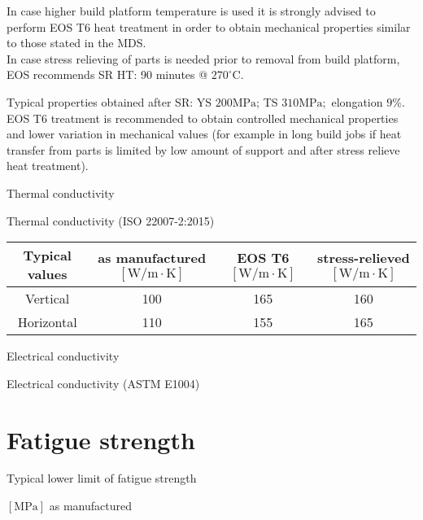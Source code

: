 \documentclass[10pt]{article}
\begin{document}
In case higher build platform temperature is used it is strongly advised to perform EOS T6 heat treatment in order to obtain mechanical properties similar to those stated in the MDS.\\
In case stress relieving of parts is needed prior to removal from build platform, EOS recommends SR HT: 90 minutes @ $270^{\circ} \mathrm{C}$.

Typical properties obtained after SR: YS $200 \mathrm{MPa}$; TS $310 \mathrm{MPa} ;$ elongation $9 \%$.\\
EOS T6 treatment is recommended to obtain controlled mechanical properties and lower variation in mechanical values (for example in long build jobs if heat transfer from parts is limited by low amount of support and after stress relieve heat treatment).

Thermal conductivity

Thermal conductivity (ISO 22007-2:2015)

\begin{center}
\begin{tabular}{|c|c|c|c|}
\hline
Typical values & as manufactured $[\mathrm{W} / \mathrm{m} \cdot \mathrm{K}]$ & EOS T6 $[\mathrm{W} / \mathrm{m} \cdot \mathrm{K}]$ & stress-relieved $[\mathrm{W} / \mathrm{m} \cdot \mathrm{K}]$ \\
\hline
Vertical & 100 & 165 & 160 \\
\hline
Horizontal & 110 & 155 & 165 \\
\hline
\end{tabular}
\end{center}

Electrical conductivity

Electrical conductivity (ASTM E1004)

\begin{center}
\begin{tabular}{lccc}
${ } }$ & EOS T6 [\% IACS $]$ & stress-relieved [\% IACS] &  \\
\hline
Horizontal & 25 & 44 & 44 \\
\hline
\end{tabular}
\end{center}

\section*{Fatigue strength}
Typical lower limit of fatigue strength

$[\mathrm{MPa}]$ as manufactured
\end{document}
